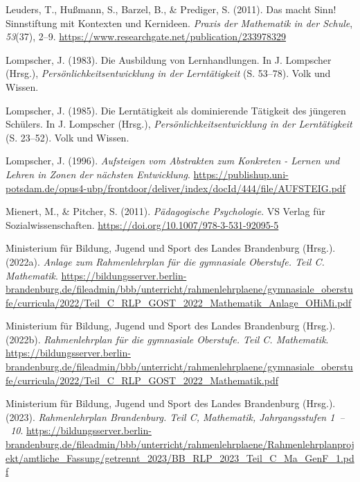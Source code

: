 \documentclass[
]{scrbook}
\newlength{\cslhangindent}
\newenvironment{CSLReferences}[2] %
 {\begin{list}{}{%
  \setlength{\itemindent}{0pt}
  \setlength{\leftmargin}{0pt}
  \setlength{\parsep}{0pt}
  \ifodd #1
   \setlength{\leftmargin}{\cslhangindent}
   \setlength{\itemindent}{-1\cslhangindent}
  \fi
  \setlength{\itemsep}{#2\baselineskip}}}
 {\end{list}}
\theoremstyle{definition}
\theoremstyle{definition}
\theoremstyle{definition}
\theoremstyle{definition}
\theoremstyle{remark}
\begin{document}
\begin{CSLReferences}{1}{0}
Leuders, T., Hußmann, S., Barzel, B., \& Prediger, S. (2011). Das macht {Sinn}! {Sinnstiftung} mit {Kontexten} und {Kernideen}. \emph{Praxis der Mathematik in der Schule}, \emph{53}(37), 2--9. \url{https://www.researchgate.net/publication/233978329}

Lompscher, J. (1983). Die {Ausbildung} von {Lernhandlungen}. In J. Lompscher (Hrsg.), \emph{Persönlichkeitsentwicklung in der {Lerntätigkeit}} (S. 53--78). Volk und Wissen.

Lompscher, J. (1985). Die {Lerntätigkeit} als dominierende {Tätigkeit} des jüngeren {Schülers}. In J. Lompscher (Hrsg.), \emph{Persönlichkeitsentwicklung in der {Lerntätigkeit}} (S. 23--52). Volk und Wissen.

Lompscher, J. (1996). \emph{Aufsteigen vom {Abstrakten} zum {Konkreten} - {Lernen} und {Lehren} in {Zonen} der nächsten {Entwicklung}}. \url{https://publishup.uni-potsdam.de/opus4-ubp/frontdoor/deliver/index/docId/444/file/AUFSTEIG.pdf}

Mienert, M., \& Pitcher, S. (2011). \emph{Pädagogische {Psychologie}}. VS Verlag für Sozialwissenschaften. \url{https://doi.org/10.1007/978-3-531-92095-5}

Ministerium für Bildung, Jugend und Sport des Landes Brandenburg (Hrsg.). (2022a). \emph{Anlage zum {Rahmenlehrplan} für die gymnasiale {Oberstufe}. {Teil} {C}. {Mathematik}}. \url{https://bildungsserver.berlin-brandenburg.de/fileadmin/bbb/unterricht/rahmenlehrplaene/gymnasiale_oberstufe/curricula/2022/Teil_C_RLP_GOST_2022_Mathematik_Anlage_OHiMi.pdf}

Ministerium für Bildung, Jugend und Sport des Landes Brandenburg (Hrsg.). (2022b). \emph{Rahmenlehrplan für die gymnasiale {Oberstufe}. {Teil} {C}. {Mathematik}}. \url{https://bildungsserver.berlin-brandenburg.de/fileadmin/bbb/unterricht/rahmenlehrplaene/gymnasiale_oberstufe/curricula/2022/Teil_C_RLP_GOST_2022_Mathematik.pdf}

Ministerium für Bildung, Jugend und Sport des Landes Brandenburg (Hrsg.). (2023). \emph{Rahmenlehrplan {Brandenburg}. {Teil} {C}, {Mathematik}, {Jahrgangsstufen} 1~--~10}. \url{https://bildungsserver.berlin-brandenburg.de/fileadmin/bbb/unterricht/rahmenlehrplaene/Rahmenlehrplanprojekt/amtliche_Fassung/getrennt_2023/BB_RLP_2023_Teil_C_Ma_GenF_1.pdf}


\end{CSLReferences}
\end{document}
